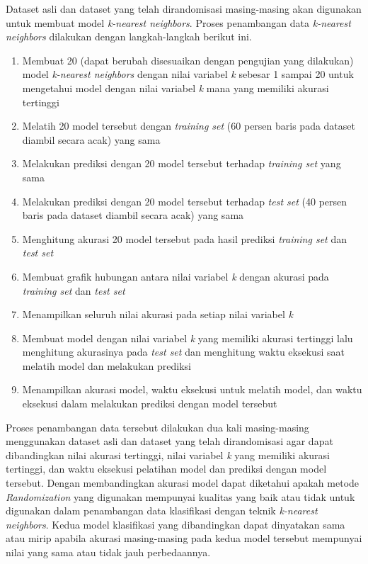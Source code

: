 Dataset asli dan dataset yang telah dirandomisasi masing-masing akan digunakan untuk membuat model \textit{k-nearest neighbors}. Proses penambangan data \textit{k-nearest neighbors} dilakukan dengan langkah-langkah berikut ini.
\begin{enumerate}
    \item Membuat 20 (dapat berubah disesuaikan dengan pengujian yang dilakukan) model \textit{k-nearest neighbors} dengan nilai variabel \textit{k} sebesar 1 sampai 20 untuk mengetahui model dengan nilai variabel \textit{k} mana yang memiliki akurasi tertinggi
    \item Melatih 20 model tersebut dengan \textit{training set} (60 persen baris pada dataset diambil secara acak) yang sama
    \item Melakukan prediksi dengan 20 model tersebut terhadap \textit{training set} yang sama
    \item Melakukan prediksi dengan 20 model tersebut terhadap \textit{test set} (40 persen baris pada dataset diambil secara acak) yang sama
    \item Menghitung akurasi 20 model tersebut pada hasil prediksi \textit{training set} dan \textit{test set}
    \item Membuat grafik hubungan antara nilai variabel \textit{k} dengan akurasi pada \textit{training set} dan \textit{test set}
    \item Menampilkan seluruh nilai akurasi pada setiap nilai variabel \textit{k}
    \item Membuat model dengan nilai variabel \textit{k} yang memiliki akurasi tertinggi lalu menghitung akurasinya pada \textit{test set} dan menghitung waktu eksekusi saat melatih model dan melakukan prediksi
    \item Menampilkan akurasi model, waktu eksekusi untuk melatih model, dan waktu eksekusi dalam melakukan prediksi dengan model tersebut
\end{enumerate}
Proses penambangan data tersebut dilakukan dua kali masing-masing menggunakan dataset asli dan dataset yang telah dirandomisasi agar dapat dibandingkan nilai akurasi tertinggi, nilai variabel \textit{k} yang memiliki akurasi tertinggi, dan waktu eksekusi pelatihan model dan prediksi dengan model tersebut. Dengan membandingkan akurasi model dapat diketahui apakah metode \textit{Randomization} yang digunakan mempunyai kualitas yang baik atau tidak untuk digunakan dalam penambangan data klasifikasi dengan teknik \textit{k-nearest neighbors}. Kedua model klasifikasi yang dibandingkan dapat dinyatakan sama atau mirip apabila akurasi masing-masing pada kedua model tersebut mempunyai nilai yang sama atau tidak jauh perbedaannya.

